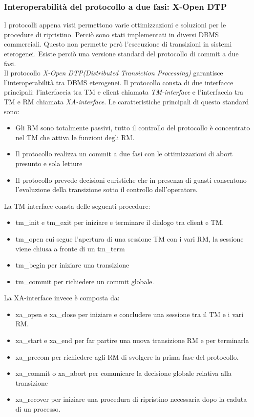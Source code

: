 \subsubsection{Interoperabilità del protocollo a due fasi: X-Open DTP}
I protocolli appena visti permettono varie ottimizzazioni e soluzioni per le procedure di ripristino. Perciò sono stati implementati in diversi DBMS commerciali. Questo non permette però l'esecuzione di transizioni in sistemi eterogenei. Esiste perciò una versione standard del protocollo di commit a due fasi.\\
Il protocollo \emph{X-Open DTP(Distributed Transiction Processing)} garantisce l'interoperabilità tra DBMS eterogenei. Il protocollo consta di due interfacce principali: l'interfaccia tra TM e client chiamata \emph{TM-interface} e l'interfaccia tra TM e RM chiamata \emph{XA-interface}.
Le caratteristiche principali di questo standard sono:
\begin{itemize}
\item Gli RM sono totalmente passivi, tutto il controllo del protocollo è concentrato nel TM che attiva le funzioni degli RM.
\item Il protocollo realizza un commit a due fasi con le ottimizzazioni di abort presunto e sola letture
\item Il protocollo prevede decisioni euristiche che in presenza di guasti consentono l'evoluzione della transizione sotto il controllo dell'operatore.
\end{itemize}
La TM-interface consta delle seguenti procedure: 
\begin{itemize}
\item \textsf{tm\_init} e \textsf{tm\_exit} per iniziare e terminare il dialogo tra client e TM.
\item \textsf{tm\_open} cui segue l'apertura di una sessione TM con i vari RM, la sessione viene chiusa a fronte di un \textsf{tm\_term}
\item \textsf{tm\_begin} per iniziare una transizione
\item \textsf{tm\_commit} per richiedere un commit globale.
\end{itemize}
La XA-interface invece è composta da:
\begin{itemize}
\item \textsf{xa\_open} e \textsf{xa\_close} per iniziare e concludere una sessione tra il TM e i vari RM.
\item \textsf{xa\_start} e \textsf{xa\_end} per far partire una nuova transizione RM e per terminarla
\item  \textsf{xa\_precom} per richiedere agli RM di svolgere la prima fase del protocollo.
\item \textsf{xa\_commit} o \textsf{xa\_abort} per comunicare la decisione globale relativa alla transizione
\item \textsf{xa\_recover} per iniziare una procedura di ripristino necessaria dopo la caduta di un processo.
\end{itemize}
